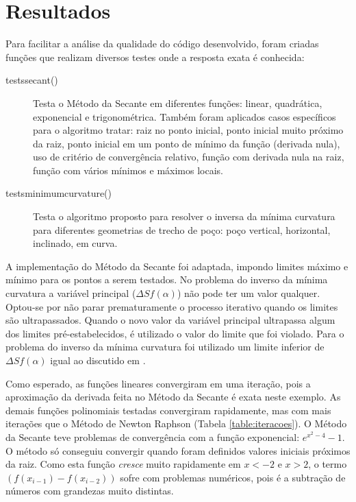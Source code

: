 \documentclass[final,5p]{elsarticle}
\numberwithin{equation}{section}
\begin{document}
    \section{Resultados}
    
    Para facilitar a análise da qualidade do código desenvolvido, foram criadas funções que realizam diversos testes onde a resposta exata é conhecida:

    \begin{description}
        \item[tests\textunderscore secant()] Testa o Método da Secante em diferentes funções: linear, quadrática, exponencial e trigonométrica. Também foram aplicados casos específicos para o algoritmo tratar: raiz no ponto inicial, ponto inicial muito próximo da raiz, ponto inicial em um ponto de mínimo da função (derivada nula), uso de critério de convergência relativo, função com derivada nula na raiz, função com vários mínimos e máximos locais.
        
        \item[tests\textunderscore minimum\textunderscore curvature()] Testa o algoritmo proposto para resolver o inversa da mínima curvatura para diferentes geometrias de trecho de poço: poço vertical, horizontal, inclinado, em curva.
    \end{description}

    A implementação do Método da Secante foi adaptada, impondo limites máximo e mínimo para os pontos a serem testados. No problema do inverso da mínima curvatura a variável principal ($\Delta S f(\alpha)$) não pode ter um valor qualquer. Optou-se por não parar prematuramente o processo iterativo quando os limites são ultrapassados. Quando o novo valor da variável principal ultrapassa algum dos limites pré-estabelecidos, é utilizado o valor do limite que foi violado. Para o problema do inverso da mínima curvatura foi utilizado um limite inferior de $\Delta S f(\alpha)$ igual ao discutido em \cite{relatoriobisseccao}.

    Como esperado, as funções lineares convergiram em uma iteração, pois a aproximação da derivada feita no Método da Secante é exata neste exemplo. As demais funções polinomiais testadas convergiram rapidamente, mas com mais iterações que o Método de Newton Raphson (Tabela \ref{table:iteracoes}). O Método da Secante teve problemas de convergência com a função exponencial: $e^{x^2-4}-1$. O método só conseguiu convergir quando foram definidos valores iniciais próximos da raiz. Como esta função \emph{cresce} muito rapidamente em $x<-2$ e $x>2$, o termo $(f(x_{i-1})-f(x_{i-2}))$ sofre com problemas numéricos, pois é a subtração de números com grandezas muito distintas.
\end{document}
